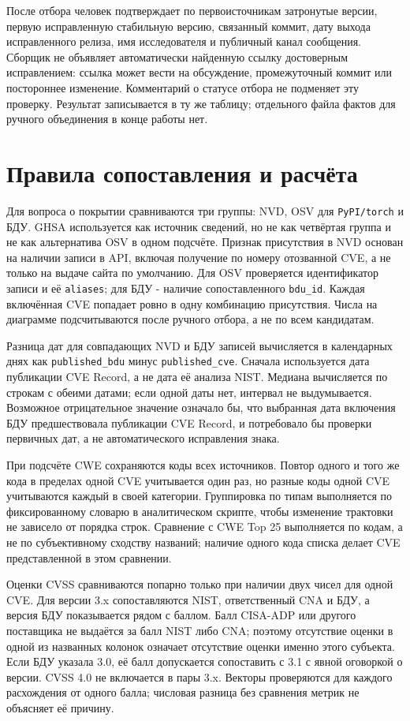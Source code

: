 \documentclass[12pt,a4paper]{report}
\begin{document}
После отбора человек подтверждает по первоисточникам затронутые версии, первую исправленную стабильную версию, связанный коммит, дату выхода исправленного релиза, имя исследователя и публичный канал сообщения. Сборщик не объявляет автоматически найденную ссылку достоверным исправлением: ссылка может вести на обсуждение, промежуточный коммит или постороннее изменение. Комментарий о статусе отбора не подменяет эту проверку. Результат записывается в ту же таблицу; отдельного файла фактов для ручного объединения в конце работы нет.

\section{Правила сопоставления и расчёта}

Для вопроса о покрытии сравниваются три группы: NVD, OSV для \texttt{PyPI/torch} и БДУ. GHSA используется как источник сведений, но не как четвёртая группа и не как альтернатива OSV в одном подсчёте. Признак присутствия в NVD основан на наличии записи в API, включая получение по номеру отозванной CVE, а не только на выдаче сайта по умолчанию. Для OSV проверяется идентификатор записи и её \texttt{aliases}; для БДУ - наличие сопоставленного \texttt{bdu\_id}. Каждая включённая CVE попадает ровно в одну комбинацию присутствия. Числа на диаграмме подсчитываются после ручного отбора, а не по всем кандидатам.

Разница дат для совпадающих NVD и БДУ записей вычисляется в календарных днях как \texttt{published\_bdu} минус \texttt{published\_cve}. Сначала используется дата публикации CVE Record, а не дата её анализа NIST. Медиана вычисляется по строкам с обеими датами; если одной даты нет, интервал не выдумывается. Возможное отрицательное значение означало бы, что выбранная дата включения БДУ предшествовала публикации CVE Record, и потребовало бы проверки первичных дат, а не автоматического исправления знака.

При подсчёте CWE сохраняются коды всех источников. Повтор одного и того же кода в пределах одной CVE учитывается один раз, но разные коды одной CVE учитываются каждый в своей категории. Группировка по типам выполняется по фиксированному словарю в аналитическом скрипте, чтобы изменение трактовки не зависело от порядка строк. Сравнение с CWE Top 25 выполняется по кодам, а не по субъективному сходству названий; наличие одного кода списка делает CVE представленной в этом сравнении.

Оценки CVSS сравниваются попарно только при наличии двух чисел для одной CVE. Для версии 3.x сопоставляются NIST, ответственный CNA и БДУ, а версия БДУ показывается рядом с баллом. Балл CISA-ADP или другого поставщика не выдаётся за балл NIST либо CNA; поэтому отсутствие оценки в одной из названных колонок означает отсутствие оценки именно этого субъекта. Если БДУ указала 3.0, её балл допускается сопоставить с 3.1 с явной оговоркой о версии. CVSS 4.0 не включается в пары 3.x. Векторы проверяются для каждого расхождения от одного балла; числовая разница без сравнения метрик не объясняет её причину.
\end{document}

